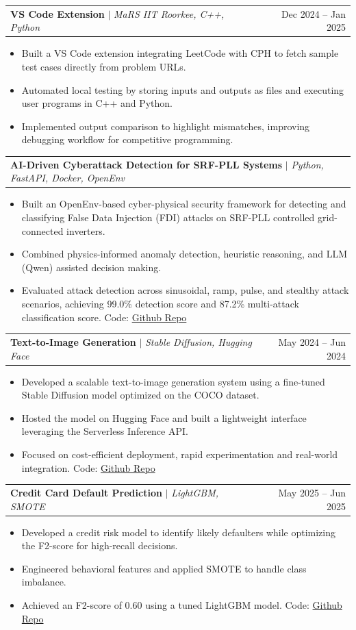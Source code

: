 \documentclass[letterpaper,11pt]{article}
\makeatletter
\newcommand{\resumeItem}[1]{\item\small{{#1 \vspace{-2pt}}}}
\newcommand{\resumeProjectHeading}[2]{
\item
\begin{tabular*}{0.97\textwidth}{l@{\extracolsep{\fill}}r}
\small#1 & #2 \\
\end{tabular*}\vspace{-7pt}
}
\newcommand{\resumeItemListStart}{\begin{itemize}}
\newcommand{\resumeItemListEnd}{\end{itemize}\vspace{-5pt}}
\makeatother
\begin{document}
\resumeProjectHeading
{\textbf{VS Code Extension}
$|$
\emph{MaRS IIT Roorkee, C++, Python}}
{Dec 2024 -- Jan 2025}

\resumeItemListStart
\resumeItem{Built a VS Code extension integrating LeetCode with CPH to fetch sample test cases directly from problem URLs.}
\resumeItem{Automated local testing by storing inputs and outputs as files and executing user programs in C++ and Python.}
\resumeItem{Implemented output comparison to highlight mismatches, improving debugging workflow for competitive programming.}
\resumeItemListEnd

\resumeProjectHeading
{\textbf{AI-Driven Cyberattack Detection for SRF-PLL Systems} $|$ \emph{Python, FastAPI, Docker, OpenEnv}}{}
\resumeItemListStart
    \resumeItem{Built an OpenEnv-based cyber-physical security framework for detecting and classifying False Data Injection (FDI) attacks on SRF-PLL controlled grid-connected inverters.}
    \resumeItem{Combined physics-informed anomaly detection, heuristic reasoning, and LLM (Qwen) assisted decision making.}
    \resumeItem{Evaluated attack detection across sinusoidal, ramp, pulse, and stealthy attack scenarios, achieving 99.0\% detection score and 87.2\% multi-attack classification score.}Code: \href{https://github.com/KrisKeshav/PLL-Cyberattack-Detection-OpenEnv}{Github Repo}
\resumeItemListEnd

\resumeProjectHeading
{\textbf{Text-to-Image Generation}
$|$
\emph{Stable Diffusion, Hugging Face}}
{May 2024 -- Jun 2024}

\resumeItemListStart
\resumeItem{Developed a scalable text-to-image generation system using a fine-tuned Stable Diffusion model optimized on the COCO dataset.}
\resumeItem{Hosted the model on Hugging Face and built a lightweight interface leveraging the Serverless Inference API.}
\resumeItem{Focused on cost-efficient deployment, rapid experimentation and real-world integration.}Code: \href{https://github.com/KrisKeshav/Text_to_Image_generator}{Github Repo}
\resumeItemListEnd

\resumeProjectHeading
{\textbf{Credit Card Default Prediction}
$|$
\emph{LightGBM, SMOTE}}
{May 2025 -- Jun 2025}

\resumeItemListStart
\resumeItem{Developed a credit risk model to identify likely defaulters while optimizing the F2-score for high-recall decisions.}
\resumeItem{Engineered behavioral features and applied SMOTE to handle class imbalance.}
\resumeItem{Achieved an F2-score of 0.60 using a tuned LightGBM model.}Code: \href{https://github.com/KrisKeshav/Credit-Card-Default-Prediction-using-Classification-and-Risk-Based-Techniques}{Github Repo}
\resumeItemListEnd
\end{document}
